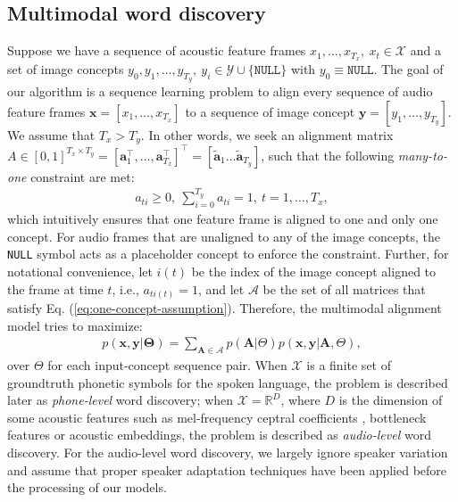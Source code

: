 \documentclass[journal]{IEEEtran}
\newcommand{\reals}{\mathbb R}
\begin{document}
\subsection{Multimodal word discovery}
Suppose we have a sequence of acoustic feature frames $x_1, \ldots, x_{T_x},~x_t \in \mathcal X$ and a set of image concepts $y_0, y_1, \ldots, y_{T_y},~y_i \in \mathcal Y \cup \{\texttt{NULL}\}$ with $y_0 \equiv \texttt{NULL}$. The goal of our algorithm is a sequence learning problem to align every sequence of audio feature frames $\mathbf x = [x_1, \ldots, x_{T_x}]$ to a sequence of image concept $\mathbf y = [y_1, \ldots, y_{T_y}]$.  We assume that $T_x > T_y$. In other words, we seek an alignment matrix $A \in [0, 1]^{T_x \times T_y}=[\mathbf a_1^\top, \ldots, \mathbf a_{T_x}^{\top}]^{\top} = [\tilde{\mathbf a}_1 \ldots \tilde{\mathbf a}_{T_y}]$, such that the following \textit{many-to-one} constraint are met:
\begin{align}\label{eq:one-concept-assumption}
    a_{ti} \geq 0,~\sum_{i=0}^{T_y} a_{ti} = 1,~t = 1, \ldots, T_x,
\end{align}
which intuitively ensures that one feature frame is aligned to one and only one concept. For audio frames that are unaligned to any of the image concepts, the \texttt{NULL} symbol acts as a placeholder concept to enforce the constraint. Further, for notational convenience, let $i(t)$ be the index of the image concept aligned to the frame at time $t$, i.e., $a_{ti(t)} = 1$, and let  $\mathcal A$ be the set of all matrices that satisfy Eq. (\ref{eq:one-concept-assumption}). Therefore, the multimodal alignment model tries to maximize:
\begin{align}\label{eq:general_trans_prob}
    p(\mathbf{x},\mathbf{y}|\mathbf \Theta) = \sum_{\mathbf{A}\in \mathcal A} p(\mathbf{A}|\Theta) p(\mathbf{x}, \mathbf{y}|\mathbf{A}, \Theta),
\end{align}
over $\Theta$ for each input-concept sequence pair. When $\mathcal X$ is a finite set of groundtruth phonetic symbols for the spoken language, the problem is described later as \textit{phone-level} word discovery; when $\mathcal X = \reals^{D}$, where $D$ is the dimension of some acoustic features such as mel-frequency ceptral coefficients \cite{Davis1980}, bottleneck features \cite{Roweis1997, Fer2017} or acoustic embeddings, the problem is described as \textit{audio-level} word discovery. For the audio-level word discovery, we largely ignore speaker variation and assume that proper speaker adaptation techniques have been applied before the processing of our models.
\end{document}
